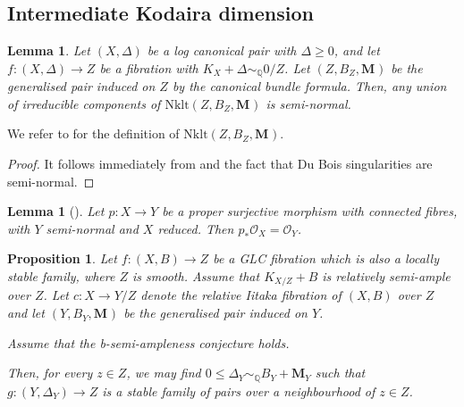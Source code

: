 \documentclass[12pt]{amsart}
\theoremstyle{plain}
\newtheorem{lemma}[theorem]{Lemma}
\newtheorem{proposition}[theorem]{Proposition}
\theoremstyle{definition}
\def\QQ{\mathbb Q}
\def\rar{\rightarrow}
\def\bM#1.{\mathbf{M}_{#1}}
\def\K#1.{K_{#1}}
\begin{document}
\subsection{Intermediate Kodaira dimension}




\begin{lemma} \label{lemma_seminormal}
Let $(X,\Delta)$ be a log canonical pair with $\Delta \geq 0$, and let $f \colon (X,\Delta) \rar Z$ be a 
fibration with $\K X. + \Delta \sim_\QQ 0/Z$.
Let $(Z,B_Z,\bM.)$ be the generalised pair induced on $Z$ by the canonical bundle formula.
Then, any union of irreducible components of $\mathrm{Nklt}(Z,B_Z,\bM.)$ is semi-normal.
\end{lemma}

We refer to \cite[\S~2]{FS20} for the definition of $\mathrm{Nklt}(Z,B_Z,\bM.)$.

\begin{proof}
It follows immediately from \cite[Theorem 1.6]{Liu22} and the fact that Du Bois singularities are semi-normal.
\end{proof}



\begin{lemma}[{\cite[Lemma 2.3]{FI21}}] \label{lemma:connected:fivers:vs:cohomol:connected:fibers}
Let $p \colon X\to Y$ be a proper surjective morphism with connected fibres, 
with $Y$ semi-normal and $X$ reduced.
Then $p_* \mathcal{O} _X = \mathcal{O}_Y$.
\end{lemma}


\begin{proposition} \label{semistable_iitaka}
Let $f \colon (X, B) \rar Z$ be a GLC fibration which is also a locally stable family, where $Z$ is smooth.
Assume that $\K X/Z. + B$ is relatively semi-ample over $Z$.
Let $c \colon X \rar Y/Z$ denote the relative Iitaka fibration of $(X, B)$ over $Z$ and
let $(Y,B_Y,\bM.)$ be the generalised pair induced on $Y$.

Assume that the b-semi-ampleness conjecture holds.


Then, for every $z \in Z$, we may find $0 \leq \Delta_Y \sim_\QQ B_Y+\bM Y.$
such that $g \colon (Y, \Delta_Y) \rar Z$ is a stable family of pairs over a neighbourhood of $z \in Z$.
\end{proposition}
\end{document}
